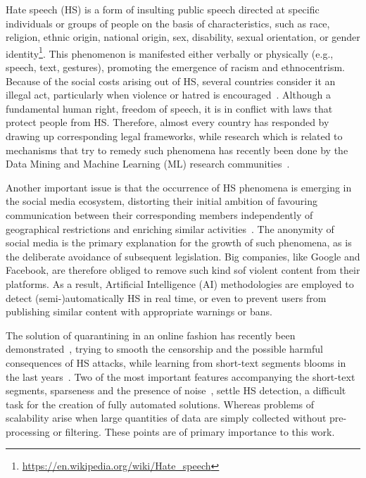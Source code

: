 \documentclass{article}
\begin{document}
Hate speech (HS) is a form of insulting public speech directed at specific individuals or groups of people on the basis of characteristics, such as race, religion, ethnic origin, national origin, sex, disability, sexual orientation, or gender identity\footnote{\url{https://en.wikipedia.org/wiki/Hate_speech}}. This phenomenon is manifested either verbally or physically (e.g., speech, text, gestures), promoting the emergence of racism and ethnocentrism. Because of the social costs arising out of HS, several countries consider it an illegal act, particularly when violence or hatred is encouraged~\cite{DBLP:conf/ijcai/DinakarPL15}. Although a fundamental human right, freedom of speech, it is in conflict with laws that protect people from HS. Therefore, almost every country has responded by drawing up corresponding legal frameworks, while research which is related to mechanisms that try to remedy such phenomena has recently been done by the Data Mining and Machine Learning (ML) research communities~\cite{JIROTKA2020100002}.

Another important issue is that the occurrence of HS phenomena is emerging in the social media ecosystem, distorting their initial ambition of favouring communication between their corresponding members independently of geographical restrictions and enriching similar activities~\cite{DBLP:conf/sai/TangC20}. The anonymity of social media is the primary explanation for the growth of such phenomena, as is the deliberate avoidance of subsequent legislation. Big companies, like Google and Facebook, are therefore obliged to remove such kind sof violent content from their platforms. As a result, Artificial Intelligence (AI) methodologies are employed to detect (semi-)automatically HS in real time, or even to prevent users from publishing similar content with appropriate warnings or bans. 

The solution of quarantining in an online fashion has recently been demonstrated~\cite{DBLP:journals/ethicsit/UllmannT20}, trying to smooth the censorship and the possible harmful consequences of HS attacks, while learning from short-text segments blooms in the last years~\cite{TOMMASEL20181}. Two of the most important features accompanying the short-text segments, sparseness and the presence of noise~\cite{DBLP:journals/ker/TommaselG19}, settle HS detection, a difficult task for the creation of fully automated solutions. Whereas problems of scalability arise when large quantities of data are simply collected without pre-processing or filtering. These points are of primary importance to this work.
\end{document}
